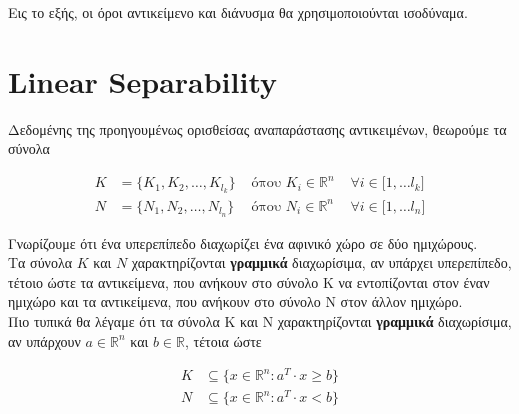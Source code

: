 \documentclass[12pt]{article}
\newcommand{\R}{\mathbb{R}}
\newcommand{\margin}{\hspace{4pt}}
\begin{document}
Εις το εξής, οι όροι αντικείμενο και διάνυσμα θα χρησιμοποιούνται ισοδύναμα. \\

\pagebreak

\section{Linear Separability}

Δεδομένης της προηγουμένως ορισθείσας αναπαράστασης αντικειμένων, θεωρούμε τα σύνολα

\begin{align*}
    K & = \{K_{1}, K_{2}, \dotsc , K_{l_k}\} & \text{ όπου }  K_i \in \R^{n} & \margin \forall i \in \lbrack 1, \dotsc l_k \rbrack \\
    N & = \{N_{1}, N_{2}, \dotsc , N_{l_n}\} & \text{ όπου }  N_i \in \R^{n} & \margin \forall i \in \lbrack 1, \dotsc l_n \rbrack
\end{align*}

Γνωρίζουμε ότι ένα υπερεπίπεδο διαχωρίζει ένα αφινικό χώρο σε δύο ημιχώρους. \\

Τα σύνολα \( K \) και \( N \) χαρακτηρίζονται \textbf{γραμμικά} διαχωρίσιμα,
αν υπάρχει υπερεπίπεδο, τέτοιο ώστε τα αντικείμενα,
που ανήκουν στο σύνολο Κ να εντοπίζονται στον έναν ημιχώρο και τα αντικείμενα,
που ανήκουν στο σύνολο N στον άλλον ημιχώρο. \\

Πιο τυπικά θα λέγαμε ότι τα σύνολα Κ και N χαρακτηρίζονται \textbf{γραμμικά} διαχωρίσιμα,
αν υπάρχουν \( a \in \R^{n} \) και \( b \in \R \), τέτοια ώστε

\begin{align*}
    K & \subseteq \{ x \in \R^{n} : a^{T} \cdot x \geq b \} \\
    N & \subseteq \{ x \in \R^{n} : a^{T} \cdot x < b\}
\end{align*}
\end{document}
